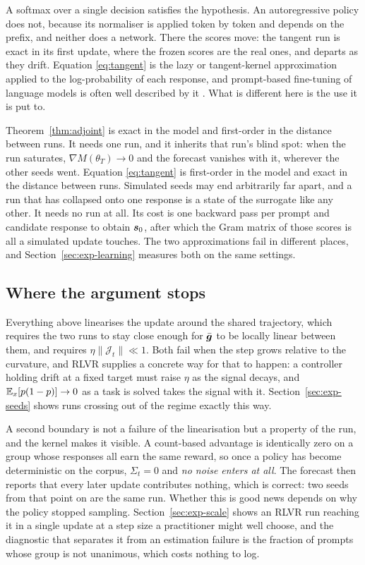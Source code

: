 A softmax over a single decision satisfies the hypothesis. An autoregressive policy does not,
because its normaliser is applied token by token and depends on the prefix, and neither does a
network. There the scores move: the tangent run is exact in its first update, where the frozen
scores are the real ones, and departs as they drift. Equation \eqref{eq:tangent} is the lazy or
tangent-kernel approximation \citep{jacot2018ntk, chizat2019lazy, lee2019wide} applied to the
log-probability of each response, and prompt-based fine-tuning of language models is often well
described by it \citep{malladi2023kernel}. What is different here is the use it is put to.

Theorem~\ref{thm:adjoint} is exact in the model and first-order in the distance between runs. It
needs one run, and it inherits that run's blind spot: when the run saturates,
$\nabla M(\theta_T) \to 0$ and the forecast vanishes with it, wherever the other seeds went.
Equation \eqref{eq:tangent} is first-order in the model and exact in the distance between runs.
Simulated seeds may end arbitrarily far apart, and a run that has collapsed onto one response is a
state of the surrogate like any other. It needs no run at all. Its cost is one backward pass per
prompt and candidate response to obtain $\bm{s}_0$, after which the Gram matrix of those scores is
all a simulated update touches. The two approximations fail in different places, and
Section~\ref{sec:exp-learning} measures both on the same settings.

\subsection{Where the argument stops}

Everything above linearises the update around the shared trajectory, which requires the two runs to
stay close enough for $\bar{\bm{g}}$ to be locally linear between them, and requires
$\eta\|\mathcal{J}_t\| \ll 1$. Both fail when the step grows relative to the curvature, and RLVR supplies a
concrete way for that to happen: a controller holding drift at a fixed target must raise $\eta$ as
the signal decays, and $\mathbb{E}_x[p(1-p)] \to 0$ as a task is solved takes the signal with it.
Section~\ref{sec:exp-seeds} shows runs crossing out of the regime exactly this way.

A second boundary is not a failure of the linearisation but a property of the run, and the kernel
makes it visible. A count-based advantage is identically zero on a group whose responses all earn
the same reward, so once a policy has become deterministic on the corpus, $\Sigma_t = 0$ and
\emph{no noise enters at all}. The forecast then reports that every later update contributes
nothing, which is correct: two seeds from that point on are the same run. Whether this is good news
depends on why the policy stopped sampling. Section~\ref{sec:exp-scale} shows an RLVR run reaching
it in a single update at a step size a practitioner might well choose, and the diagnostic that
separates it from an estimation failure is the fraction of prompts whose group is not unanimous,
which costs nothing to log.

